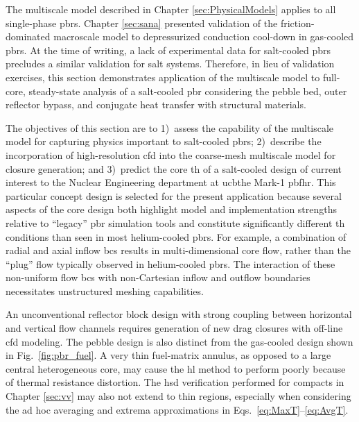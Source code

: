 The multiscale model described in Chapter \ref{sec:PhysicalModels} applies to all single-phase \glspl{pbr}. Chapter \ref{sec:sana} presented validation of the friction-dominated macroscale model to depressurized conduction cool-down in gas-cooled \glspl{pbr}. At the time of writing, a lack of experimental data for salt-cooled \glspl{pbr} precludes a similar validation for salt systems. Therefore, in lieu of validation exercises, this section demonstrates application of the multiscale model to full-core, steady-state analysis of a salt-cooled \gls{pbr} considering the pebble bed, outer reflector bypass, and conjugate heat transfer with structural materials. 

The objectives of this section are to 1)~assess the capability of the multiscale model for capturing physics important to salt-cooled \glspl{pbr}; 2)~describe the incorporation of high-resolution \gls{cfd} into the coarse-mesh multiscale model for closure generation; and 3)~predict the core \gls{th} of a salt-cooled design of current interest to the Nuclear Engineering department at \gls{ucb}\mdash the Mark-1 \gls{pbfhr}. This particular concept design is selected for the present application because several aspects of the core design both highlight model and implementation strengths relative to ``legacy'' \gls{pbr} simulation tools and constitute significantly different \gls{th} conditions than seen in most helium-cooled \glspl{pbr}. For example, a combination of radial and axial inflow \glspl{bc} results in multi-dimensional core flow, rather than the ``plug'' flow typically observed in helium-cooled \glspl{pbr}. The interaction of these non-uniform flow \glspl{bc} with non-Cartesian inflow and outflow boundaries necessitates unstructured meshing capabilities. 

An unconventional reflector block design with strong coupling between horizontal and vertical flow channels requires generation of new drag closures with off-line \gls{cfd} modeling. The pebble design is also distinct from the gas-cooled design shown in Fig.\ \ref{fig:pbr_fuel}. A very thin fuel-matrix annulus, as opposed to a large central heterogeneous core, may cause the \gls{hl} method to perform poorly because of thermal resistance distortion. The \gls{hsd} verification performed for compacts in Chapter \ref{sec:vv} may also not extend to thin regions, especially when considering the ad hoc averaging and extrema approximations in Eqs.\ \eqref{eq:MaxT}--\eqref{eq:AvgT}.

